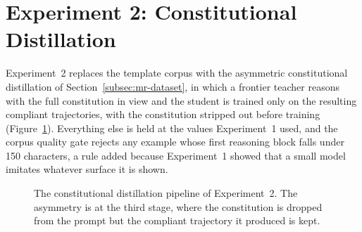 \section{Experiment 2: Constitutional Distillation}
\label{sec:mr-exp2}
\label{subsec:mr-exp2-results}

Experiment~2 replaces the template corpus with the asymmetric constitutional distillation of Section~\ref{subsec:mr-dataset}, in which a frontier teacher reasons with the full constitution in view and the student is trained only on the resulting compliant trajectories, with the constitution stripped out before training (Figure~\ref{fig:sft-pipeline-constitution}). Everything else is held at the values Experiment~1 used, and the corpus quality gate rejects any example whose first reasoning block falls under 150 characters, a rule added because Experiment~1 showed that a small model imitates whatever surface it is shown.

\begin{figure}[H]
  \centering
  \caption[The constitutional distillation pipeline of Experiment~2]{The constitutional distillation pipeline of Experiment~2. The asymmetry is at the third stage, where the constitution is dropped from the prompt but the compliant trajectory it produced is kept.}
  \label{fig:sft-pipeline-constitution}
\end{figure}


